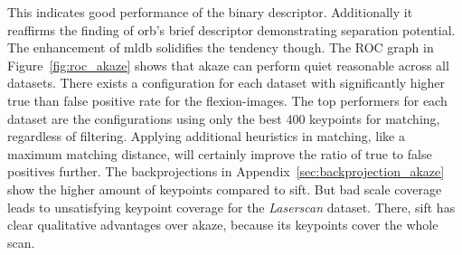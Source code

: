 This indicates good performance of the binary descriptor.
Additionally it reaffirms the finding of \acrshort{orb}'s \acrshort{brief} descriptor demonstrating separation potential.
The enhancement of \acrshort{mldb} solidifies the tendency though.
The \acrshort{ROC} graph in Figure~\ref{fig:roc_akaze} shows that \acrshort{akaze} can perform quiet reasonable across all datasets.
There exists a configuration for each dataset with significantly higher true than false positive rate for the \glspl{flexion-image}.
The top performers for each dataset are the configurations using only the best 400 keypoints for matching, regardless of filtering.
Applying additional heuristics in matching, like a maximum matching distance, will certainly improve the ratio of true to false positives further.
The backprojections in Appendix~\ref{sec:backprojection_akaze} show the higher amount of keypoints compared to \acrshort{sift}.
But bad scale coverage leads to unsatisfying keypoint coverage for the \emph{Laserscan} dataset.
There, \acrshort{sift} has clear qualitative advantages over \acrshort{akaze}, because its keypoints cover the whole scan.
